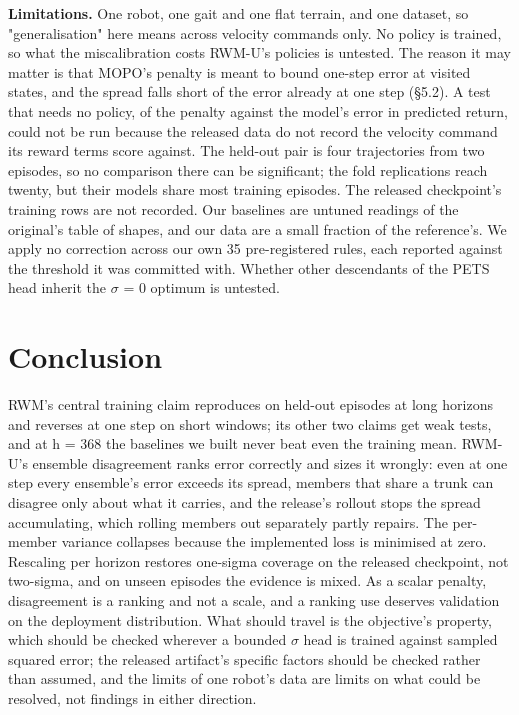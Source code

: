 \documentclass[10pt]{article}
\begin{document}
\textbf{Limitations.} One robot, one gait and one flat terrain, and one dataset, so "generalisation" here means across velocity commands only. No policy is trained, so what the miscalibration costs RWM-U's policies is untested. The reason it may matter is that MOPO's penalty is meant to bound one-step error at visited states, and the spread falls short of the error already at one step (\S{}5.2). A test that needs no policy, of the penalty against the model's error in predicted return, could not be run because the released data do not record the velocity command its reward terms score against. The held-out pair is four trajectories from two episodes, so no comparison there can be significant; the fold replications reach twenty, but their models share most training episodes. The released checkpoint's training rows are not recorded. Our baselines are untuned readings of the original's table of shapes, and our data are a small fraction of the reference's. We apply no correction across our own 35 pre-registered rules, each reported against the threshold it was committed with. Whether other descendants of the PETS head inherit the $\sigma$ = 0 optimum is untested.


\section{Conclusion}

RWM's central training claim reproduces on held-out episodes at long horizons and reverses at one step on short windows; its other two claims get weak tests, and at h = 368 the baselines we built never beat even the training mean. RWM-U's ensemble disagreement ranks error correctly and sizes it wrongly: even at one step every ensemble's error exceeds its spread, members that share a trunk can disagree only about what it carries, and the release's rollout stops the spread accumulating, which rolling members out separately partly repairs. The per-member variance collapses because the implemented loss is minimised at zero. Rescaling per horizon restores one-sigma coverage on the released checkpoint, not two-sigma, and on unseen episodes the evidence is mixed. As a scalar penalty, disagreement is a ranking and not a scale, and a ranking use deserves validation on the deployment distribution. What should travel is the objective's property, which should be checked wherever a bounded $\sigma$ head is trained against sampled squared error; the released artifact's specific factors should be checked rather than assumed, and the limits of one robot's data are limits on what could be resolved, not findings in either direction.
\end{document}
